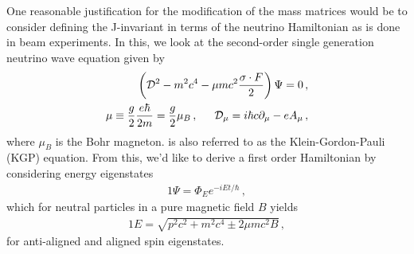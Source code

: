 One reasonable justification for the modification of the mass matrices would be to consider defining the J-invariant in terms of the neutrino Hamiltonian as is done in beam experiments. In this, we look at the second-order single generation neutrino wave equation given by 
\begin{alignat}{1}
	\label{kgp:1} \left(\mathcal{D}^{2}-m^{2}c^{4}-\mu mc^{2}\frac{\sigma\cdot F}{2}\right)\Psi=0\,,\\
	\label{kgp:2} \mu\equiv\frac{g}{2}\frac{e\hbar}{2m}=\frac{g}{2}\mu_{B}\,,\indent \mathcal{D}_{\mu}=i\hbar c\partial_{\mu}-eA_{\mu}\,,
\end{alignat}
where $\mu_{B}$ is the Bohr magneton.  is also referred to as the Klein-Gordon-Pauli (KGP) equation. \ar From this, we'd like to derive a first order Hamiltonian by considering energy eigenstates
\begin{alignat}{1}
	\label{eigen:1} \Psi = \Phi_{E}e^{-iEt/\hbar}\,,
\end{alignat}
which for neutral particles in a pure magnetic field $B$ yields
\begin{alignat}{1}
	\label{eigen:2} E = \sqrt{p^{2}c^{2}+m^{2}c^{4}\pm2\mu mc^{2}B}\,,
\end{alignat}
for anti-aligned and aligned spin eigenstates.

